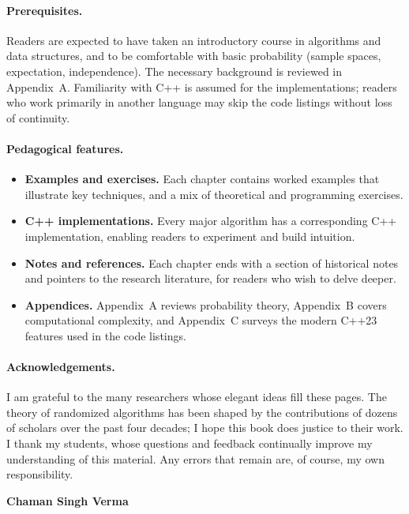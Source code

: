 \documentclass[twoside,12pt]{book}
\theoremstyle{plain}
\theoremstyle{definition}
\theoremstyle{remark}
\begin{document}
\paragraph{Prerequisites.}
Readers are expected to have taken an introductory course in algorithms and
data structures, and to be comfortable with basic probability (sample
spaces, expectation, independence).  The necessary background is reviewed
in Appendix~A.  Familiarity with C++ is assumed for the
implementations; readers who work primarily in another language may skip the
code listings without loss of continuity.

\paragraph{Pedagogical features.}
\begin{itemize}[nosep]
  \item \textbf{Examples and exercises.} Each chapter contains worked
    examples that illustrate key techniques, and a mix of theoretical and
    programming exercises.
  \item \textbf{C++ implementations.} Every major algorithm has a
    corresponding C++ implementation, enabling readers to experiment and
    build intuition.
  \item \textbf{Notes and references.} Each chapter ends with a section
    of historical notes and pointers to the research literature, for
    readers who wish to delve deeper.
  \item \textbf{Appendices.} Appendix~A reviews probability theory,
    Appendix~B covers computational complexity, and Appendix~C surveys the
    modern C++23 features used in the code listings.
\end{itemize}

\paragraph{Acknowledgements.}
I am grateful to the many researchers whose elegant ideas fill these pages.
The theory of randomized algorithms has been shaped by the contributions of
dozens of scholars over the past four decades; I hope this book does justice
to their work.  I thank my students, whose questions and feedback
continually improve my understanding of this material.  Any errors that
remain are, of course, my own responsibility.

\vspace{1em}
\noindent\textbf{Chaman Singh Verma}\\
\end{document}
